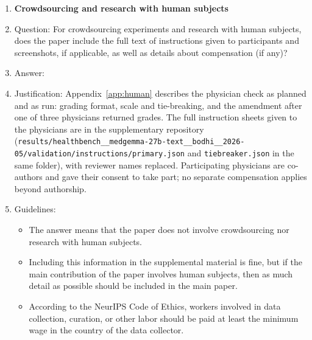\begin{enumerate}
\item {\bf Crowdsourcing and research with human subjects}
    \item[] Question: For crowdsourcing experiments and research with human subjects, does the paper include the full text of instructions given to participants and screenshots, if applicable, as well as details about compensation (if any)?
    \item[] Answer: \answerYes{}
    \item[] Justification: Appendix~\ref{app:human} describes the physician check as planned and as run: grading format, scale and tie-breaking, and the amendment after one of three physicians returned grades. The full instruction sheets given to the physicians are in the supplementary repository (\texttt{results/\allowbreak healthbench\_\_medgemma-27b-text\_\_bodhi\_\_2026-05/\allowbreak validation/\allowbreak instructions/\allowbreak primary.json} and \texttt{tiebreaker.json} in the same folder), with reviewer names replaced. Participating physicians are co-authors and gave their consent to take part; no separate compensation applies beyond authorship.
    \item[] Guidelines:
    \begin{itemize}
        \item The answer \answerNA{} means that the paper does not involve crowdsourcing nor research with human subjects.
        \item Including this information in the supplemental material is fine, but if the main contribution of the paper involves human subjects, then as much detail as possible should be included in the main paper.
        \item According to the NeurIPS Code of Ethics, workers involved in data collection, curation, or other labor should be paid at least the minimum wage in the country of the data collector.
    \end{itemize}


\end{enumerate}
